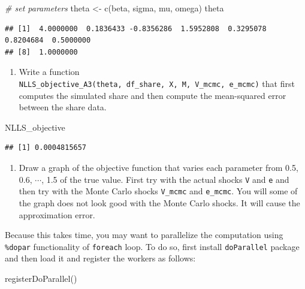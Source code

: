 \documentclass[
]{book}
\newenvironment{Shaded}{\begin{snugshade}}{\end{snugshade}}
\newcommand{\CommentTok}[1]{\textcolor[rgb]{0.56,0.35,0.01}{\textit{#1}}}
\newcommand{\FunctionTok}[1]{\textcolor[rgb]{0.00,0.00,0.00}{#1}}
\newcommand{\NormalTok}[1]{#1}
\newcommand{\OtherTok}[1]{\textcolor[rgb]{0.56,0.35,0.01}{#1}}
\providecommand{\tightlist}{%
  \setlength{\itemsep}{0pt}\setlength{\parskip}{0pt}}
\begin{document}
\begin{Shaded}
\begin{Highlighting}[]
\CommentTok{\# set parameters}
\NormalTok{theta }\OtherTok{\textless{}{-}} \FunctionTok{c}\NormalTok{(beta, sigma, mu, omega)}
\NormalTok{theta}
\end{Highlighting}
\end{Shaded}

\begin{verbatim}
## [1]  4.0000000  0.1836433 -0.8356286  1.5952808  0.3295078  0.8204684  0.5000000
## [8]  1.0000000
\end{verbatim}

\begin{enumerate}
\def\labelenumi{\arabic{enumi}.}
\setcounter{enumi}{5}
\tightlist
\item
  Write a function \texttt{NLLS\_objective\_A3(theta,\ df\_share,\ X,\ M,\ V\_mcmc,\ e\_mcmc)} that first computes the simulated share and then compute the mean-squared error between the share data.
\end{enumerate}

\begin{Shaded}
\begin{Highlighting}[]
\NormalTok{NLLS\_objective}
\end{Highlighting}
\end{Shaded}

\begin{verbatim}
## [1] 0.0004815657
\end{verbatim}

\begin{enumerate}
\def\labelenumi{\arabic{enumi}.}
\setcounter{enumi}{6}
\tightlist
\item
  Draw a graph of the objective function that varies each parameter from 0.5, 0.6, \(\cdots\), 1.5 of the true value. First try with the actual shocks \texttt{V} and \texttt{e} and then try with the Monte Carlo shocks \texttt{V\_mcmc} and \texttt{e\_mcmc}. You will some of the graph does not look good with the Monte Carlo shocks. It will cause the approximation error.
\end{enumerate}

Because this takes time, you may want to parallelize the computation using \texttt{\%dopar} functionality of \texttt{foreach} loop. To do so, first install \texttt{doParallel} package and then load it and register the workers as follows:

\begin{Shaded}
\begin{Highlighting}[]
\FunctionTok{registerDoParallel}\NormalTok{()}
\end{Highlighting}
\end{Shaded}
\end{document}
